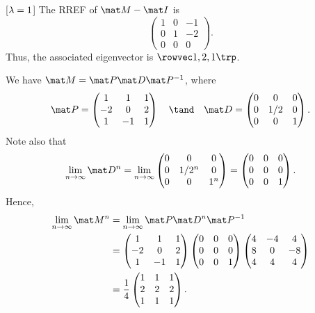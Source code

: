\begin{solution}
\begin{ppart}
        [$\lambda = 1$] The RREF of $\mat M - \mat I$ is \[\begin{pmatrix}1 & 0 & - 1 \\ 0 & 1 & -2 \\ 0 & 0 & 0\end{pmatrix}.\] Thus, the associated eigenvector is $\cveciiix121$.
    \end{ppart}
    \begin{ppart}
        We have $\mat M = \mat P \mat D \mat P^{-1}$, where \[\mat P = \begin{pmatrix}1 & 1 & 1 \\ -2 & 0 & 2 \\ 1 & -1 & 1\end{pmatrix} \quad \tand \quad \mat D = \begin{pmatrix}0 & 0 & 0 \\ 0 & 1/2 & 0 \\ 0 & 0 & 1\end{pmatrix}.\] Note also that \[\lim_{n \to \infty} \mat D^n = \lim_{n \to \infty} \begin{pmatrix}0 & 0 & 0 \\ 0 & 1/2^n & 0 \\ 0 & 0 & 1^n\end{pmatrix} = \begin{pmatrix}0 & 0 & 0 \\ 0 & 0 & 0 \\ 0 & 0 & 1\end{pmatrix}.\] Hence,
        \begin{align*}
            \lim_{n \to \infty} \mat M^n &= \lim_{n \to \infty} \mat P \mat D^n \mat P^{-1}\\
            &= \begin{pmatrix}1 & 1 & 1 \\ -2 & 0 & 2 \\ 1 & -1 & 1\end{pmatrix} \begin{pmatrix}0 & 0 & 0 \\ 0 & 0 & 0 \\ 0 & 0 & 1\end{pmatrix} \begin{pmatrix}4 & -4 & 4 \\ 8 & 0 & -8 \\ 4 & 4 & 4\end{pmatrix}\\
            &= \frac14 \begin{pmatrix}1 & 1 & 1 \\ 2 & 2 & 2 \\ 1 & 1 & 1\end{pmatrix}.

\end{align*}
\end{ppart}
\end{solution}
